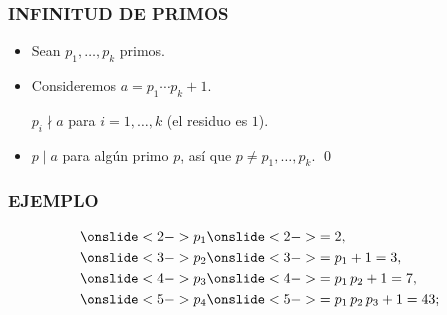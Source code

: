 \begin{frame}
  \frametitle{INFINITUD DE PRIMOS}



  \begin{itemize}
  \item<4-> Sean $p_1, \ldots, p_k$ primos.

  \item<5-> Consideremos $a = p_1 \cdots p_k + 1$.

    $p_i \nmid a$ para $i = 1,\ldots,k$ (el residuo es $1$).

  \item<6-> $p \mid a$ para algún primo $p$, así que $p \ne p_1, \ldots, p_k$. \qed
  \end{itemize}

  \vspace{1em}

\end{frame}

\begin{frame}
  \frametitle{EJEMPLO}

  \begin{align*}
    \onslide<2->{p_1} & \onslide<2->{= 2,} \\
    \onslide<3->{p_2} & \onslide<3->{= p_1 + 1 = 3,} \\
    \onslide<4->{p_3} & \onslide<4->{= p_1\,p_2 + 1 = 7,} \\
    \onslide<5->{p_4} & \onslide<5->{= p_1\,p_2\,p_3 + 1 = 43;}
  \end{align*}


\end{frame}


